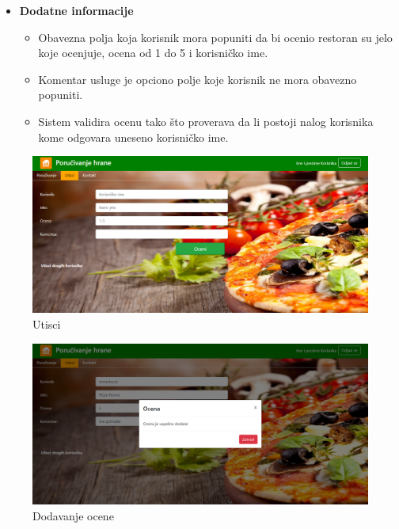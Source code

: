 \begin{itemize}
     \item \textbf{Dodatne informacije}
 \begin{itemize}
     \item Obavezna polja koja korisnik mora popuniti da bi ocenio restoran su jelo koje ocenjuje, ocena od 1 do 5 i korisni\v cko ime.
     \item Komentar usluge je opciono polje koje korisnik ne mora obavezno popuniti.
    \item Sistem validira ocenu tako što proverava da li postoji nalog korisnika kome odgovara uneseno korisničko ime.
 \end{itemize}
 \end{itemize}
 
 \begin{figure}[ht]
    \leavevmode
    \begin{center}
    \includegraphics[height=0.3\textheight]{slike/utisci.png}
    \end{center}
    \caption{Utisci} %
    \label{fig:slika_utisci}
\end{figure}

 \begin{figure}[ht]
    \leavevmode
    \begin{center}
    \includegraphics[height=0.3\textheight]{slike/utisci1.png}
    \end{center}
    \caption{Dodavanje ocene} %
    \label{fig:slika_utisci1}
\end{figure}
